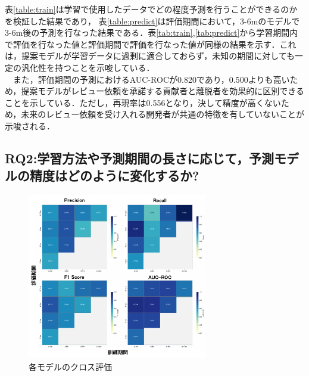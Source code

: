 \documentclass[submit,techrep,noauthor]{ipsj}
\begin{document}
表\ref{table:train}は学習で使用したデータでどの程度予測を行うことができるのかを検証した結果であり，
表\ref{table:predict}は評価期間において，3-6mのモデルで3-6m後の予測を行なった結果である．表\ref{tab:train},\ref{tab:predict}から学習期間内で評価を行なった値と評価期間で評価を行なった値が同様の結果を示す．これは，提案モデルが学習データに過剰に適合しておらず，未知の期間に対しても一定の汎化性を持つことを示唆している．\\
　また，評価期間の予測におけるAUC-ROCが0.820であり，0.500よりも高いため，提案モデルがレビュー依頼を承諾する貢献者と離脱者を効果的に区別できることを示している．ただし，再現率は0.556となり，決して精度が高くないため，未来のレビュー依頼を受け入れる開発者が共通の特徴を有していないことが示唆される．

\subsection{RQ2:学習方法や予測期間の長さに応じて，予測モデルの精度はどのように変化するか?}
\begin{figure}[t]
    \centering
\includegraphics[width=0.7\textwidth]{./Hashimoto_fig/heatmap.pdf}
    \caption{各モデルのクロス評価}
    \label{fig:result}
\end{figure}
\end{document}
